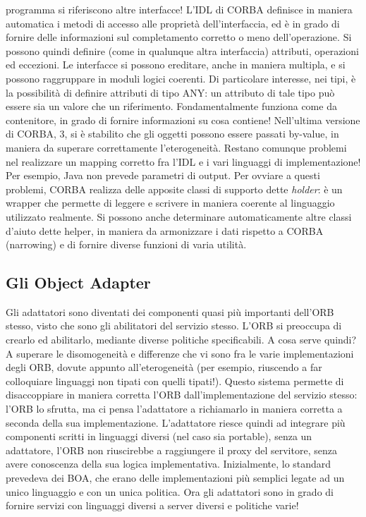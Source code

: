 programma si riferiscono altre interfacce!
L'IDL di CORBA definisce in maniera automatica i metodi di accesso alle proprietà dell'interfaccia, ed è in grado di
fornire delle informazioni sul completamento corretto o meno dell'operazione. Si possono quindi definire (come
in qualunque altra interfaccia) attributi, operazioni ed eccezioni. Le interfacce si possono ereditare, anche in maniera
multipla, e si possono raggruppare in moduli logici coerenti.
Di particolare interesse, nei tipi, è la possibilità di definire attributi di tipo ANY: un attributo di tale tipo può
essere sia un valore che un riferimento. Fondamentalmente funziona come da contenitore, in grado di fornire informazioni
su cosa contiene! Nell'ultima versione di CORBA, 3, si è stabilito che gli oggetti possono essere passati by-value, in
maniera da superare correttamente l'eterogeneità.
Restano comunque problemi nel realizzare un mapping corretto fra l'IDL e i vari linguaggi di implementazione! Per
esempio, Java non prevede parametri di output. Per ovviare a questi problemi, CORBA realizza delle apposite classi di supporto dette
\textit{holder}: è un wrapper che permette di leggere e scrivere in maniera coerente al linguaggio utilizzato realmente.
Si possono anche determinare automaticamente altre classi d'aiuto dette helper, in maniera da armonizzare i dati
rispetto a CORBA (narrowing) e di fornire diverse funzioni di varia utilità.
\subsection{Gli Object Adapter}
Gli adattatori sono diventati dei componenti quasi più importanti dell'ORB stesso, visto che sono gli abilitatori del
servizio stesso. L'ORB si preoccupa di crearlo ed abilitarlo, mediante diverse politiche specificabili.
A cosa serve quindi? A superare le disomogeneità e differenze che vi sono fra le varie implementazioni degli ORB, dovute
appunto all'eterogeneità (per esempio, riuscendo a far colloquiare linguaggi non tipati con quelli tipati!).
Questo sistema permette di disaccoppiare in maniera corretta l'ORB dall'implementazione del servizio stesso: l'ORB lo
sfrutta, ma ci pensa l'adattatore a richiamarlo in maniera corretta a seconda della sua implementazione. L'adattatore
riesce quindi ad integrare più componenti scritti in linguaggi diversi (nel caso sia portable), senza un adattatore, l'ORB non riuscirebbe a
raggiungere il proxy del servitore, senza avere conoscenza della sua logica implementativa.
Inizialmente, lo standard prevedeva dei BOA, che erano delle implementazioni più semplici legate ad un unico linguaggio e con un unica politica. Ora gli adattatori sono in
grado di fornire servizi con linguaggi diversi a server diversi e politiche varie!
